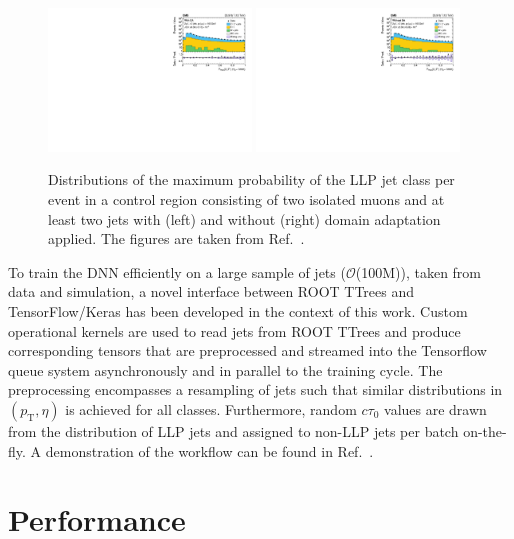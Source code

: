 \documentclass{webofc}
\newcommand{\ctau}{\ensuremath{c\tau_{0}}\xspace}
\newcommand{\pt}{\ensuremath{p_\textrm{T}}\xspace}
\begin{document}
\begin{figure}[!ht]
\includegraphics[width=0.48\textwidth]{figs/2mu_2toNj__llpdnnx_da_0_max_highpt.pdf}\hspace{0.03\textwidth}
\includegraphics[width=0.48\textwidth]{figs/2mu_2toNj__llpdnnx_noda_0_max_highpt.pdf}
\centering
\caption{Distributions of the maximum probability of the LLP jet class per event in a control region consisting of two isolated muons and at least two jets with (left) and without (right) domain adaptation applied. The figures are taken from Ref.~\cite{CMS-EXO-19-011}.}
\label{da}
\end{figure}

To train the DNN efficiently on a large sample of jets ($\mathcal{O}$(100M)), taken from data and simulation, a novel interface between ROOT TTrees and TensorFlow/Keras has been developed in the context of this work. Custom operational kernels are used to read jets from ROOT TTrees and produce corresponding tensors that are preprocessed and streamed into the Tensorflow queue system asynchronously and in parallel to the training cycle. The preprocessing encompasses a resampling of jets such that similar distributions in $(\pt,\eta)$ is achieved for all classes. Furthermore, random \ctau values are drawn from the distribution of LLP jets and assigned to non-LLP jets per batch on-the-fly. A demonstration of the workflow can be found in Ref.~\cite{code}.

\section{Performance}
\label{peformance}
\end{document}
